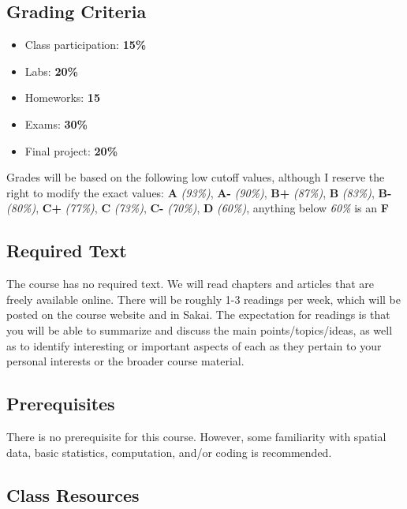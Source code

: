 \documentclass[11pt,]{article}
\providecommand{\tightlist}{%
  \setlength{\itemsep}{0pt}\setlength{\parskip}{0pt}}
\begin{document}
\hypertarget{grading-criteria}{%
\subsection{Grading Criteria}\label{grading-criteria}}

\begin{itemize}
\tightlist
\item
  Class participation: \textbf{15\%}
\item
  Labs: \textbf{20\%}
\item
  Homeworks: \textbf{15}
\item
  Exams: \textbf{30\%}
\item
  Final project: \textbf{20\%}
\end{itemize}

Grades will be based on the following low cutoff values, although I
reserve the right to modify the exact values: \textbf{A} \emph{(93\%)},
\textbf{A-} \emph{(90\%)}, \textbf{B+} \emph{(87\%)}, \textbf{B}
\emph{(83\%)}, \textbf{B-} \emph{(80\%)}, \textbf{C+} \emph{(77\%)},
\textbf{C} \emph{(73\%)}, \textbf{C-} \emph{(70\%)}, \textbf{D}
\emph{(60\%)}, anything below \emph{60\%} is an \textbf{F}

\hypertarget{required-text}{%
\subsection{Required Text}\label{required-text}}

The course has no required text. We will read chapters and articles that
are freely available online. There will be roughly 1-3 readings per
week, which will be posted on the course website and in Sakai. The
expectation for readings is that you will be able to summarize and
discuss the main points/topics/ideas, as well as to identify interesting
or important aspects of each as they pertain to your personal interests
or the broader course material.

\hypertarget{prerequisites}{%
\subsection{Prerequisites}\label{prerequisites}}

There is no prerequisite for this course. However, some familiarity with
spatial data, basic statistics, computation, and/or coding is
recommended.

\hypertarget{class-resources}{%
\subsection{Class Resources}\label{class-resources}}
\end{document}
